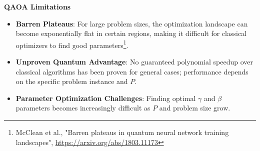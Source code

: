 \noindent
{}
\textbf{QAOA Limitations}

\begin{itemize}
  \item \textbf{Barren Plateaus}: For large problem sizes, the optimization
    landscape can become exponentially flat in certain regions, making it
    difficult for classical optimizers to find good
    parameters\footnote{McClean et al., "Barren plateaus in quantum neural
    network training landscapes", \url{https://arxiv.org/abs/1803.11173}}.

  \item \textbf{Unproven Quantum Advantage}: No guaranteed polynomial speedup
    over classical algorithms has been proven for general cases; performance
    depends on the specific problem instance and $P$.

  \item \textbf{Parameter Optimization Challenges}: Finding optimal $\gamma$
    and $\beta$ parameters becomes increasingly difficult as $P$ and problem
    size grow.
\end{itemize}


